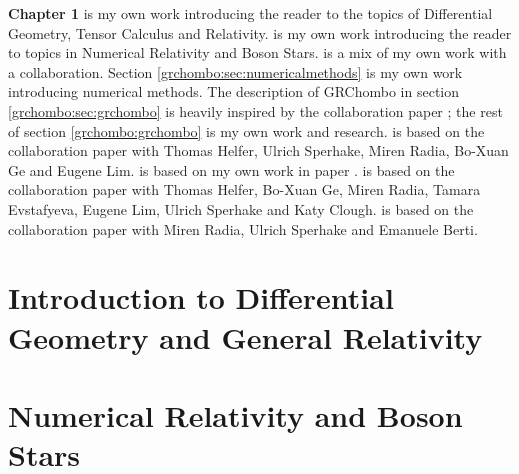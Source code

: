 \documentclass[11pt]{report}  %
\numberwithin{equation}{section}
\begin{document}
                         {\bf Chapter 1} is my own work introducing the reader to the topics of Differential Geometry, Tensor Calculus and Relativity.
  \vspace{0.5cm} is my own work introducing the reader to topics in Numerical Relativity and Boson Stars.
  \vspace{0.5cm} is a mix of my own work with a collaboration. Section \ref{grchombo:sec:numericalmethods} is my own work introducing numerical methods. The description of {\sc GRChombo} in section \ref{grchombo:sec:grchombo} is heavily inspired by the collaboration paper \cite{Andrade2021}; the rest of section \ref{grchombo:grchombo} is my own work and research.
  \vspace{0.5cm} is based on the collaboration paper \cite{Helfer:2021brt} with Thomas Helfer, Ulrich Sperhake, Miren Radia, Bo-Xuan Ge and Eugene Lim.
  \vspace{0.5cm} is based on my own work in paper \cite{Croft:2022gks}.
  \vspace{0.5cm} is based on the collaboration paper \cite{croft2022gravitational} with Thomas Helfer, Bo-Xuan Ge, Miren Radia, Tamara Evstafyeva, Eugene Lim, Ulrich Sperhake and Katy Clough.
  \vspace{0.5cm} is based on the collaboration paper \cite{Radia:2021hjs} with Miren Radia, Ulrich Sperhake and Emanuele Berti.

\newpage

\tableofcontents
\newpage
{}





\chapter{Introduction to Differential Geometry and General Relativity}












\chapter{Numerical Relativity and Boson Stars}
\end{document}
